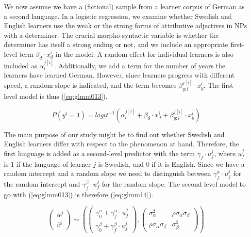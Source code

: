 \documentclass[a4paper,12pt]{article}
\begin{document}
We now assume we have a (fictional) sample from a learner corpus of German as a second language.
In a logistic regression, we examine whether Swedish and English learners use the weak or the strong forms of attributive adjectives in NPs with a determiner.
The crucial morpho-syntactic variable is whether the determiner has itself a strong ending or not, and we include an appropriate first-level term $\beta_d\cdot x_d^i$ in the model.
A random effect for individual learners is also included as $\alpha_l^{j[i]}$.
Additionally, we add a term for the number of years the learners have learned German.
However, since learners progress with different speed, a random slope is indicated, and the term becomes $\beta_{y:l}^{j[i]}\cdot x_y^i$.
The first-level model is thus (\ref{eq:glmm013}).

\begin{equation}
  P(y^i=1)=logit^{-1}(\alpha_l^{j[i]} + \beta_d\cdot x_d^i + \beta_{y:l}^{j[i]}\cdot x_y^i)
  \label{eq:glmm013}
\end{equation}

The main purpose of our study might be to find out whether Swedish and English learners differ with respect to the phenomenon at hand.
Therefore, the first language is added as a second-level predictor with the term $\gamma_f\cdot u_f^j$, where $u_f^j$ is $1$ if the language of learner $j$ is Swedish, and $0$ if it is English.
Since we have a random intercept and a random slope we need to distinguish between $\gamma_f^{\alpha}\cdot u_f^j$ for the random intercept and $\gamma_f^{\beta}\cdot u_f^j$ for the random slope.
The second level model to go with (\ref{eq:glmm013}) is therefore (\ref{eq:glmm14}).

\begin{equation} 
  \left( \begin{smallmatrix} \alpha^j \\ \beta^j \end{smallmatrix}\right) \sim
    \left(
    \left( \begin{smallmatrix} \gamma_0^{\alpha}+\gamma_f^{\alpha}\cdot u_f^j \\ \gamma_0^{\beta}+\gamma_f^{\beta}\cdot u_f^j    \end{smallmatrix} \right), 
      \left( \begin{smallmatrix} \sigma_{\alpha}^2 & \rho\sigma_{\alpha}\sigma_{\beta} \\
	\rho\sigma_{\alpha}\sigma_{\beta} & \sigma_{\beta}^2 \end{smallmatrix} \right)
    \right)
  \label{eq:glmm14}
\end{equation}
\end{document}
